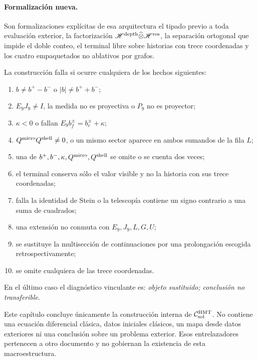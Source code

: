\paragraph{Formalización nueva.}
Son formalizaciones explícitas de esa arquitectura el tipado previo a toda
evaluación exterior, la factorización
\(\mathscr H^{\rm depth}\widehat\otimes\mathscr H^{\rm res}\), la separación
ortogonal que impide el doble conteo, el terminal libre sobre historias con
trece coordenadas y los cuatro empaquetados no ablativos por grafos.

\begin{criterion}
\label{crit:pdfv2-sol-falsifiers}
La construcción falla si ocurre cualquiera de los hechos siguientes:
\begin{enumerate}
 \item \(b\neq b^+-b^-\) o \(|b|\neq b^++b^-\);
 \item \(E_9J_9\neq I\), la medida no es proyectiva o \(P_9\) no es
       proyector;
 \item \(\kappa<0\) o fallan
       \(E_9b_f^\pm=b_c^\pm+\kappa\);
 \item \(Q^{\rm micro}Q^{\rm shell}\neq0\), o un mismo sector aparece en
       ambos sumandos de la fila \(L\);
 \item una de \(b^+,b^-,\kappa,Q^{\rm micro},Q^{\rm shell}\) se omite o se
       cuenta dos veces;
 \item el terminal conserva sólo el valor visible y no la historia con sus
       trece coordenadas;
 \item falla la identidad de Stein o la telescopía contiene un signo
       contrario a una suma de cuadrados;
 \item una extensión no conmuta con \(E_9,J_9,L,G,U\);
 \item se sustituye la multisección de continuaciones por una prolongación
       escogida retrospectivamente;
 \item se omite cualquiera de las trece coordenadas.
\end{enumerate}
En el último caso el diagnóstico vinculante es: \emph{objeto sustituido;
conclusión no transferible}.
\end{criterion}

\begin{warningbox}
Este capítulo concluye únicamente la construcción interna de
\(\mathcal C_{\rm sol}^{\rm HMT}\).  No contiene una ecuación diferencial
clásica, datos iniciales clásicos, un mapa desde datos exteriores ni una
conclusión sobre un problema exterior.  Esos entrelazadores pertenecen a otro
documento y no gobiernan la existencia de esta macroestructura.
\end{warningbox}
\fi
